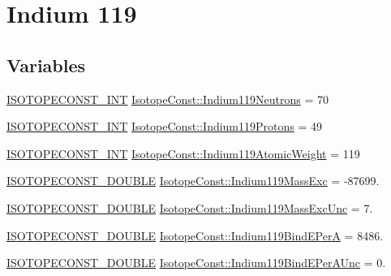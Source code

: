 \hypertarget{group___isotope_const-_indium-_in119}{}\section{Indium 119}
\label{group___isotope_const-_indium-_in119}
\subsection*{Variables}
\begin{DoxyCompactItemize}
\item 
\mbox{\hyperlink{group___isotope_const-_macros_ga5f18360b3e99483a35c32d789e62621c}{I\+S\+O\+T\+O\+P\+E\+C\+O\+N\+S\+T\+\_\+\+I\+NT}} \mbox{\hyperlink{group___isotope_const-_indium-_in119_ga00c2701c8adc7de2d20d41fa5087f6bf}{Isotope\+Const\+::\+Indium119\+Neutrons}} = 70
\item 
\mbox{\hyperlink{group___isotope_const-_macros_ga5f18360b3e99483a35c32d789e62621c}{I\+S\+O\+T\+O\+P\+E\+C\+O\+N\+S\+T\+\_\+\+I\+NT}} \mbox{\hyperlink{group___isotope_const-_indium-_in119_gaf3a9194ca6aed1cae3d97907206c1e1a}{Isotope\+Const\+::\+Indium119\+Protons}} = 49
\item 
\mbox{\hyperlink{group___isotope_const-_macros_ga5f18360b3e99483a35c32d789e62621c}{I\+S\+O\+T\+O\+P\+E\+C\+O\+N\+S\+T\+\_\+\+I\+NT}} \mbox{\hyperlink{group___isotope_const-_indium-_in119_ga7c62456c268070b1c053e69842e15575}{Isotope\+Const\+::\+Indium119\+Atomic\+Weight}} = 119
\item 
\mbox{\hyperlink{group___isotope_const-_macros_ga8f45a7272ce02c0b4c65c44636ed719a}{I\+S\+O\+T\+O\+P\+E\+C\+O\+N\+S\+T\+\_\+\+D\+O\+U\+B\+LE}} \mbox{\hyperlink{group___isotope_const-_indium-_in119_ga1538d6aaa5c6cf4f4f6c9db0fdd7534f}{Isotope\+Const\+::\+Indium119\+Mass\+Exc}} = -\/87699.
\item 
\mbox{\hyperlink{group___isotope_const-_macros_ga8f45a7272ce02c0b4c65c44636ed719a}{I\+S\+O\+T\+O\+P\+E\+C\+O\+N\+S\+T\+\_\+\+D\+O\+U\+B\+LE}} \mbox{\hyperlink{group___isotope_const-_indium-_in119_gaab4369746e6e3d85a9f8d625bdeb97c8}{Isotope\+Const\+::\+Indium119\+Mass\+Exc\+Unc}} = 7.
\item 
\mbox{\hyperlink{group___isotope_const-_macros_ga8f45a7272ce02c0b4c65c44636ed719a}{I\+S\+O\+T\+O\+P\+E\+C\+O\+N\+S\+T\+\_\+\+D\+O\+U\+B\+LE}} \mbox{\hyperlink{group___isotope_const-_indium-_in119_gae2343ecdee97179b0863c11ae97d59d5}{Isotope\+Const\+::\+Indium119\+Bind\+E\+PerA}} = 8486.
\item 
\mbox{\hyperlink{group___isotope_const-_macros_ga8f45a7272ce02c0b4c65c44636ed719a}{I\+S\+O\+T\+O\+P\+E\+C\+O\+N\+S\+T\+\_\+\+D\+O\+U\+B\+LE}} \mbox{\hyperlink{group___isotope_const-_indium-_in119_ga711e0885c21c3c7a1ac727cdaeded256}{Isotope\+Const\+::\+Indium119\+Bind\+E\+Per\+A\+Unc}} = 0.

\end{DoxyCompactItemize}
